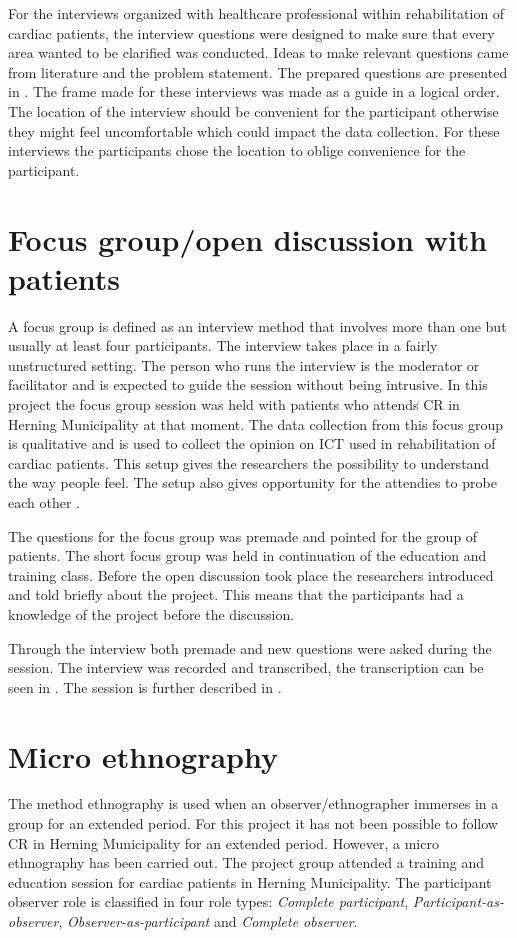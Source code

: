For the interviews organized with healthcare professional within rehabilitation of cardiac patients, the interview questions were designed to make sure that every area wanted to be clarified was conducted. Ideas to make relevant questions came from literature and the problem statement. The prepared questions are presented in . The frame made for these interviews was made as a guide in a logical order. The location of the interview should be convenient for the participant otherwise they might feel uncomfortable which could impact the data collection. For these interviews the participants chose the location to oblige convenience for the participant. 

\section {Focus group/open discussion with patients} \label{focusgroup}

A focus group is defined as an interview method that involves more than one but usually at least four participants. The interview takes place in a fairly unstructured setting. The person who runs the interview is the moderator or facilitator and is expected to guide the session without being intrusive. In this project the focus group session was held with patients who attends CR in Herning Municipality at that moment. The data collection from this focus group is qualitative and is used to collect the opinion on ICT used in rehabilitation of cardiac patients. This setup gives the researchers the possibility to understand the way people feel. The setup also gives opportunity for the attendies to probe each other \cite{brymanbell}. 

The questions for the focus group was premade and pointed for the group of patients. The short focus group was held in continuation of the education and training class. Before the open discussion took place the researchers introduced and told briefly about the project. This means that the participants had a knowledge of the project before the discussion. 

Through the interview both premade and new questions were asked during the session. The interview was recorded and transcribed, the transcription can be seen in . The session is further described in . 

\section{Micro ethnography} \label{ethnography}
The method ethnography is used when an observer/ethnographer immerses in a group for an extended period. For this project it has not been possible to follow CR in Herning Municipality for an extended period. However, a micro ethnography has been carried out. The project group attended a training and education session for cardiac patients in Herning Municipality. The participant observer role is classified in four role types: \textit{Complete participant}, \textit{Participant-as-observer}, \textit{Observer-as-participant} and \textit{Complete observer}. 

